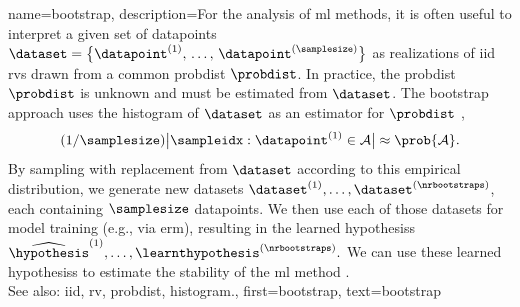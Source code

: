 {name={bootstrap},
	description={For the analysis of \gls{ml} methods, it is often useful to interpret 
		a given set of \glspl{datapoint} $\dataset = \big\{ \datapoint^{(1)}, \,\ldots, \,\datapoint^{(\samplesize)}\big\}$ 
		as \glspl{realization} of \gls{iid} \glspl{rv} drawn from a common \gls{probdist} $\probdist$. 
		In practice, the \gls{probdist} $\probdist$ is unknown and must be estimated from $\dataset$. 
		The bootstrap approach uses the \gls{histogram} of $\dataset$ as an estimator for 
		$\probdist$ \cite{hastie01statisticallearning}, 
		$$ (1/\samplesize) \big| \sampleidx: \datapoint^{(1)} \in \mathcal{A} \big| \approx \prob{\mathcal{A}}.$$
		By sampling with replacement from $\dataset$ according to this empirical distribution, 
		we generate new \glspl{dataset} 
		$\dataset^{(1)}, \ldots, \dataset^{(\nrbootstraps)}$, each containing 
		$\samplesize$ \glspl{datapoint}. We then use each of those \glspl{dataset} 
		for \gls{model} \gls{training} (e.g., via \gls{erm}), 
		resulting in the learned \glspl{hypothesis}
		$\widehat{\hypothesis}^{(1)}, \ldots, \learnthypothesis^{(\nrbootstraps)}.$ 
        We can use these learned \glspl{hypothesis} to estimate the \gls{stability} 
		of the \gls{ml} method \cite{hastie01statisticallearning}.
		\\
		See also: \gls{iid}, \gls{rv}, \gls{probdist}, \gls{histogram}.},
	first={bootstrap},
	text={bootstrap}  
}

